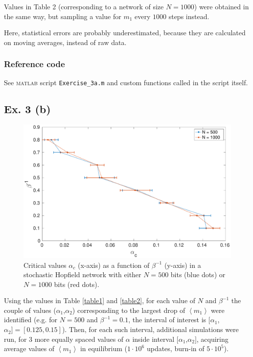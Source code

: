 \documentclass[12pt,A4,titlepage]{article}
\begin{document}
Values in Table 2 (corresponding to a network of size $N=1000$) were obtained in the same way, but sampling a value for $m_1$ every $1000$ steps instead.

Here, statistical errors are probably underestimated, because they are calculated on moving averages, instead of raw data. 
\subsubsection*{Reference code}
See \textsc{matlab} script \verb!Exercise_3a.m! and custom functions called in the script itself.
\clearpage


\subsection*{Ex. 3 (b)}


\begin{figure}[H]
\centering
\includegraphics[width=\textwidth]{figures/fig_3b.pdf}
\caption{Critical values $\alpha_c$ (x-axis) as a function of $\beta^{-1}$ (y-axis) in a stochastic Hopfield network with either $N = 500$ bits (blue dots) or $N = 1000$ bits (red dots).}
\label{3b}
\end{figure}

Using the values in Table \ref{table1} and \ref{table2}, for each value of $N$ and $\beta^{-1}$ the couple of values ($\alpha_1$,$\alpha_2$) corresponding to the largest drop of $\left<m_1\right>$ were identified (e.g. for $N = 500$ and $\beta^{-1} = 0.1$, the interval of interest is $[\alpha_1$,$\alpha_2] = [0.125,0.15]$).
Then, for each such interval, additional simulations were run, for 3 more equally spaced values of $\alpha$ inside interval $[\alpha_1$,$\alpha_2]$, acquiring average values of $\left<m_1\right>$ in equilibrium ($1\cdot10^6$ updates, burn-in of $5\cdot10^5$). 
\end{document}
